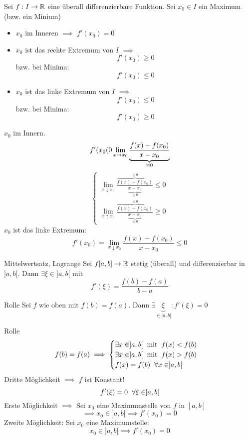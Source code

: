\begin{Sat}
  Sei $f:I\to\mathbb{R}$ eine überall differenzierbare Funktion. Sei $x_0\in I$ ein Maximum (bzw. ein Minium)
  \begin{itemize}
    \item $x_0$ im Inneren $\implies$ $f'(x_0)=0$
    \item $x_0$ ist das rechte Extremum von $I$ $\implies$
      \[f'(x_0)\geq 0\]
      bzw. bei Minima:
      \[f'(x_0)\leq 0\]
    \item $x_0$ ist das linke Extremum von $I$ $\implies$
      \[f'(x_0)\leq 0\]
      bzw. bei Minima:
      \[f'(x_0)\geq 0\]
  \end{itemize}
\end{Sat}
\begin{Bew}
  $x_0$ im Innern.
  \[f'(x_0(0\displaystyle\lim_{x\rightarrow x_0}\underbrace{\frac{f(x)-f(x_0)}{x-x_0}}_{=0}\]
  \[\begin{cases}
    \lim_{x\downarrow x_0} \frac{\overbrace{f(x)-f(x_0)}^{\leq 0}}{\underbrace{x-x_0}_{\geq 0}}\leq 0\\
    \lim_{x\uparrow x_0} \frac{\overbrace{f(x)-f(x_0)}^{\leq 0}}{\underbrace{x-x_0}_{\leq 0}}\geq 0
  \end{cases}\]
  $x_0$ ist das linke Extremum:
  \[f'(x_0)=\lim_{x\downarrow x_0}\frac{f(x)-f(x_0)}{x-x_0}\leq 0\]
\end{Bew}
\begin{Sat}{Mittelwertsatz, Lagrange}\label{s:lagrange}
  Sei $f[a,b]\to\mathbb{R}$ stetig (überall) und differenzierbar in $]a,b[$. Dann $\exists \xi\in ]a,b[$ mit
  \[f'(\xi)=\frac{f(b)-f(a)}{b-a}\]
\end{Sat}
\begin{Sat}{Rolle}\label{s:rolle}
  Sei $f$ wie oben mit $f(b)=f(a)$. Dann $\exists\underbrace{\xi}_{\in ]a,b[}:f'(\xi)=0$
\end{Sat}
\begin{Bew}{Rolle}
  \[f(b)=f(a)\implies \begin{cases}
    \exists x\in ]a,b[\hspace{2mm}\text{mit}\hspace{2mm} f(x)<f(b)\\
    \exists x\in ]a,b[\hspace{2mm}\text{mit}\hspace{2mm} f(x)>f(b)\\
    f(x)=f(b)\hspace{2mm}\forall x\in ]a,b[
  \end{cases}\]
  Dritte Möglichkeit $\implies$ $f$ ist Konstant!
  \[f'(\xi)=0\hspace{2mm}\forall \xi\in ]a,b[ \]
  Erste Möglichkeit $\implies$ Sei $x_0$ eine Maximumstelle von $f$ in $[a,b]$
  \[\implies x_0\in ]a,b[ \implies f'(x_0)=0\]
  Zweite Möglichkeit: Sei $x_0$ eine Maximumstelle:
  \[x_0\in ]a,b[\implies f'(x_0)=0\]
\end{Bew}
